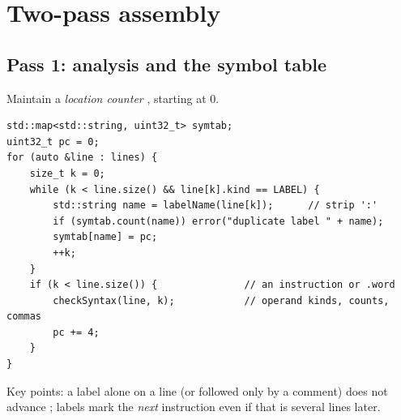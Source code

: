 \begin{center}
\end{center}

\section{Two-pass assembly}

\subsection{Pass 1: analysis and the symbol table}
Maintain a \emph{location counter} , starting at 0.
\begin{lstlisting}[style=cpp]
std::map<std::string, uint32_t> symtab;
uint32_t pc = 0;
for (auto &line : lines) {
    size_t k = 0;
    while (k < line.size() && line[k].kind == LABEL) {
        std::string name = labelName(line[k]);      // strip ':'
        if (symtab.count(name)) error("duplicate label " + name);
        symtab[name] = pc;
        ++k;
    }
    if (k < line.size()) {               // an instruction or .word
        checkSyntax(line, k);            // operand kinds, counts, commas
        pc += 4;
    }
}
\end{lstlisting}
Key points: a label alone on a line (or followed only by a comment) does not advance
; labels mark the \emph{next} instruction even if that is several lines later.

